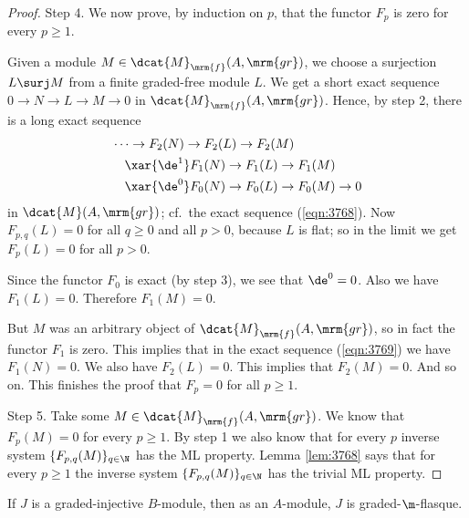 \begin{proof}
\medskip \noindent
Step 4. We now prove, by induction on $p$, that the functor $F_p$ is zero for 
every $p \geq 1$. 

Given a module $M \in \dcat{M}_{\mrm{f}}(A, \mrm{gr})$, 
we choose a surjection $L \surj M$ from a finite graded-free module $L$. 
We get a short exact sequence
$0 \to N \to L \to M \to 0$
in $\dcat{M}_{\mrm{f}}(A, \mrm{gr})$.
Hence, by step 2, there is a long exact sequence 
\begin{equation} \label{eqn:3769}
\begin{aligned}
& \cdots \to F_{2}(N) \to F_{2}(L) \to F_{2}(M) 
\\
& \quad \xar{\de^1} F_{1}(N) \to F_{1}(L) \to F_{1}(M) 
\\
& \quad \xar{\de^0} F_{0}(N) \to F_{0}(L) \to F_{0}(M) \to 0  
\end{aligned}
\end{equation}
in $\dcat{M}(A, \mrm{gr})$;  cf.\ the exact sequence (\ref{eqn:3768}).
Now $F_{p, q}(L) = 0$ for all $q \geq 0$ and all $p > 0$, because $L$ is flat; 
so in the limit we get $F_{p}(L) = 0$ for all $p > 0$. 

Since the functor $F_0$ is exact (by step 3), we see that $\de^0 = 0$. 
Also we have $F_{1}(L) = 0$. Therefore $F_{1}(M) = 0$. 

But $M$ was an arbitrary object of 
$\dcat{M}_{\mrm{f}}(A, \mrm{gr})$, so in fact the functor $F_1$ is zero. 
This implies that in the exact sequence (\ref{eqn:3769}) 
we have $F_{1}(N) = 0$. We also have  $F_{2}(L) = 0$. 
This implies that $F_2(M) = 0$. And so on. This finishes the proof that 
$F_p = 0$ for all $p \geq 1$. 

\medskip \noindent
Step 5. Take some $M \in \dcat{M}_{\mrm{f}}(A, \mrm{gr})$.
We know that $F_p(M) = 0$ for every $p \geq 1$. By step 1 we also 
know that for every $p$ inverse system $\{ F_{p, q}(M) \}_{q \in \N}$ 
has the ML property. Lemma \ref{lem:3768} says that 
for every $p \geq 1$ the inverse system $\{ F_{p, q}(M) \}_{q \in \N}$ 
has the trivial ML property.
\end{proof}

\begin{lem} \label{lem:3766}
If $J$ is a graded-injective $B$-module, then as an $A$-module, $J$ is 
graded-$\m$-flasque. 
\end{lem}

